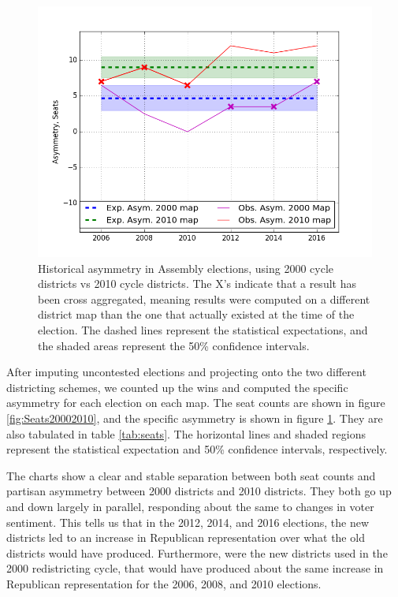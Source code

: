 \documentclass[preprint,12pt]{article}
\begin{document}
\begin{figure}[htb!]
    \begin{center}
        \includegraphics[scale=0.85]{../Figures/WI2010/WI_2000_2010.png}
        \caption{Historical asymmetry in Assembly elections, using 2000 cycle districts vs 2010 cycle districts. The X's indicate that a result has been cross aggregated, meaning results were computed on a different district map than the one that actually existed at the time of the election.  The dashed lines represent the statistical expectations, and the shaded areas represent the 50\% confidence intervals.}\label{fig:Asym20002010}
    \end{center}
\end{figure}

After imputing uncontested elections and projecting onto the two different districting schemes, we counted up the wins and computed the specific asymmetry for each election on each map.
The seat counts are shown in figure \ref{fig:Seats20002010}, and the specific asymmetry is shown in figure \ref{fig:Asym20002010}.  They are also tabulated in table \ref{tab:seats}.
The horizontal lines and shaded regions represent the statistical expectation and 50\% confidence intervals, respectively.

The charts show a clear and stable separation between both seat counts and partisan asymmetry between 2000 districts and 2010 districts.
They both go up and down largely in parallel, responding about the same to changes in voter sentiment.
This tells us that in the 2012, 2014, and 2016 elections, the new districts led to an increase in Republican representation over what the old districts would have produced.
Furthermore, were the new districts used in the 2000 redistricting cycle, that would have produced about the same increase in Republican representation for the 2006, 2008, and 2010 elections.
\end{document}
